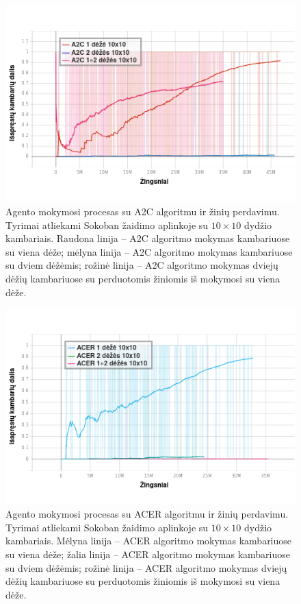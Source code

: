 \documentclass{VUMIFPSbakalaurinis}
\begin{document}
{	\begin{figure}[H]
		\centering
		\includegraphics[scale=0.75]{img/graphs/a2c_completions}
		\caption{Agento mokymosi procesas su A2C algoritmu ir žinių perdavimu. Tyrimai atliekami Sokoban žaidimo aplinkoje su \(10 \times 10\) dydžio kambariais. Raudona linija -- A2C algoritmo mokymas kambariuose su viena dėže; mėlyna linija -- A2C algoritmo mokymas kambariuose su dviem dėžėmis; rožinė linija -- A2C algoritmo mokymas dviejų dėžių kambariuose su perduotomis žiniomis iš mokymosi su viena dėže.}
		\label{img:a2c_completions}
	\end{figure}
	\begin{figure}[H]
		\centering
		\includegraphics[scale=0.75]{img/graphs/acer_completions}
		\caption{Agento mokymosi procesas su ACER algoritmu ir žinių perdavimu. Tyrimai atliekami Sokoban žaidimo aplinkoje su \(10 \times 10\) dydžio kambariais. Mėlyna linija -- ACER algoritmo mokymas kambariuose su viena dėže; žalia linija -- ACER algoritmo mokymas kambariuose su dviem dėžėmis; rožinė linija -- ACER algoritmo mokymas dviejų dėžių kambariuose su perduotomis žiniomis iš mokymosi su viena dėže.}

\end{figure}}
\end{document}

